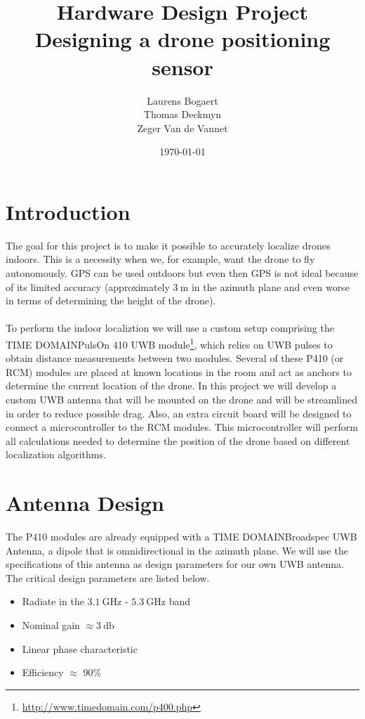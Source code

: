 \documentclass[a4paper]{article}        %
\title{Hardware Design Project\\ Designing a drone positioning sensor}
\author{Laurens Bogaert\\Thomas Deckmyn\\Zeger Van de Vannet}
\date{\today}
\begin{document}
\maketitle

\newpage
  \tableofcontents
\newpage

\section{Introduction}

The goal for this project is to make it possible to accurately localize drones indoors. This is a necessity when we, for example, want the drone to fly autonomously. GPS can be used outdoors but even then GPS is not ideal because of its limited accuracy (approximately $\SI{3}{\meter}$ in the azimuth plane and even worse in terms of determining the height of the drone). \\\\
To perform the indoor localiztion we will use a custom setup comprising the TIME DOMAIN\texttrademark PulsOn 410 UWB module\footnote{\url{http://www.timedomain.com/p400.php}}, which relies on UWB pulses to  obtain distance measurements between two modules. Several of these P410 (or RCM) modules are placed at known locations in the room and act as anchors to determine the current location of the drone. In this project we will develop a custom UWB antenna that will be mounted on the drone and will be streamlined in order to reduce possible drag. Also, an extra circuit board will be designed to connect a microcontroller to the RCM modules. This microcontroller will perform all calculations needed to determine the position of the drone based on different localization algorithms.

\section{Antenna Design}
	
	 The P410 modules are already equipped with a TIME DOMAIN\texttrademark Broadspec UWB Antenna, a dipole that is omnidirectional in the azimuth plane. We will use the specifications of this antenna as design parameters for our own UWB antenna. The critical design parameters are listed below. 

	\begin{itemize}
		\item Radiate in the $\SI{3.1}{\giga\hertz}$ - $\SI{5.3}{\giga\hertz}$ band
		\item Nominal gain $\approx \SI{3}{\decibel}$
		\item Linear phase characteristic
		\item Efficiency $\approx$ 90\%	

	\end{itemize}
\end{document}
